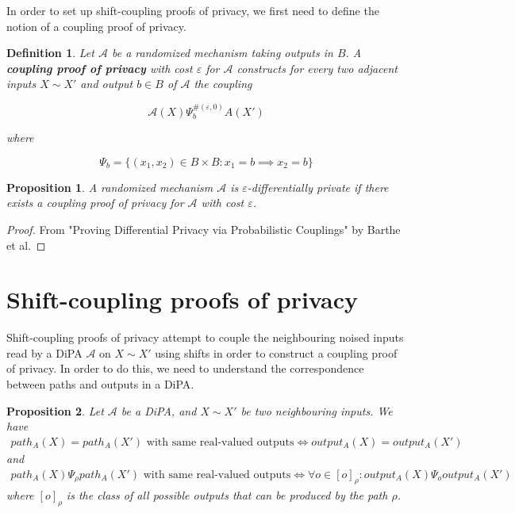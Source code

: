 \documentclass{article}
\newtheorem{proposition}{Proposition}[section]
\newtheorem{definition}{Definition}[section]
\renewcommand{\epsilon}{\varepsilon}
\newcommand{\1}{\langle 1 \rangle}
\newcommand{\2}{\langle 2 \rangle}
\begin{document}
In order to set up shift-coupling proofs of privacy, we first need to define the notion of a coupling proof of privacy. 

\begin{definition}
    Let $\mathcal{A}$ be a randomized mechanism taking outputs in $B$. A \textbf{coupling proof of privacy} with cost $\epsilon$ for $\mathcal{A}$ constructs for every two adjacent inputs $X \sim X'$ and output $b \in B$ of $\mathcal{A}$ the coupling 

    \[\mathcal{A}(X) \Psi_{b}^{\#(\epsilon, 0)} A(X')\]

    where 

    \[\Psi_{b} = \{(x_1, x_2) \in B \times B : x_1 = b \implies x_2 = b\}\]
\end{definition}

\begin{proposition}
    A randomized mechanism $\mathcal{A}$ is $\epsilon$-differentially private if there exists a coupling proof of privacy for $\mathcal{A}$ with cost $\epsilon$.
\end{proposition}

\begin{proof}
    From "Proving Differential Privacy via Probabilistic Couplings" by Barthe et al. 
\end{proof}

\section{Shift-coupling proofs of privacy}

Shift-coupling proofs of privacy attempt to couple the neighbouring noised inputs read by a DiPA $\mathcal{A}$ on $X \sim X'$ using shifts in order to construct a coupling proof of privacy. In order to do this, we need to understand the correspondence between paths and outputs in a DiPA.

\begin{proposition}
    Let $\mathcal{A}$ be a DiPA, and $X \sim X'$ be two neighbouring inputs. We have 
    \begin{align*}
        path_A(X) = path_A(X') \text{ with same real-valued outputs} \iff output_A(X) = output_A(X')
    \end{align*}
    and 
    \begin{align*}
        path_A(X) \Psi_\rho path_A(X') \text{ with same real-valued outputs} \iff \forall o \in [o]_\rho : output_A(X) \Psi_o output_A(X')
    \end{align*}
    where $[o]_\rho$ is the class of all possible outputs that can be produced by the path $\rho$.
\end{proposition}
\end{document}
